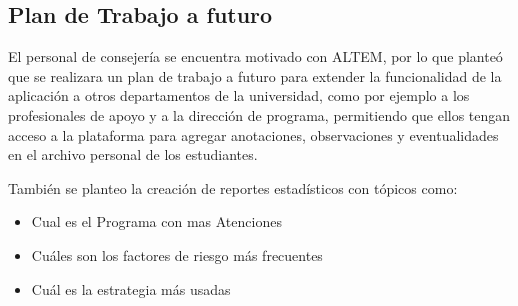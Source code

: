 \subsection{Plan de Trabajo a futuro}
El personal de consejería se encuentra motivado con ALTEM, por lo que planteó que se realizara un plan de trabajo a futuro para extender la funcionalidad de la aplicación a otros departamentos de la universidad, como por ejemplo a los profesionales de apoyo y a la dirección de programa, permitiendo que ellos tengan acceso a la plataforma para agregar anotaciones, observaciones y eventualidades en el archivo personal de los estudiantes. 

También se planteo la creación de reportes estadísticos con tópicos como:

\begin{itemize}
    \item Cual es el Programa con mas Atenciones
    \item Cuáles son los factores de riesgo más frecuentes
    \item Cuál es la estrategia más usadas
\end{itemize}


